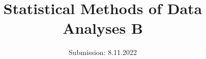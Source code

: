 

\subject{Sheet 2}
\title{Statistical Methods of Data Analyses B}
\date{
  Submission: 8.11.2022
}


\maketitle






